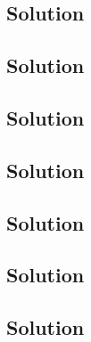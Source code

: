 \documentclass{article}
\begin{document}
\subsection{}
\clearpage
\subsection{Solution}
\clearpage
\subsection{}
\clearpage
\subsection{Solution}
\clearpage
\subsection{}
\clearpage
\subsection{Solution}
\clearpage
\subsection{}
\clearpage
\subsection{Solution}
\clearpage
\subsection{}
\clearpage
\subsection{Solution}
\clearpage
\subsection{}
\clearpage
\subsection{Solution}
\clearpage
\subsection{}
\clearpage
\subsection{Solution}
\end{document}
